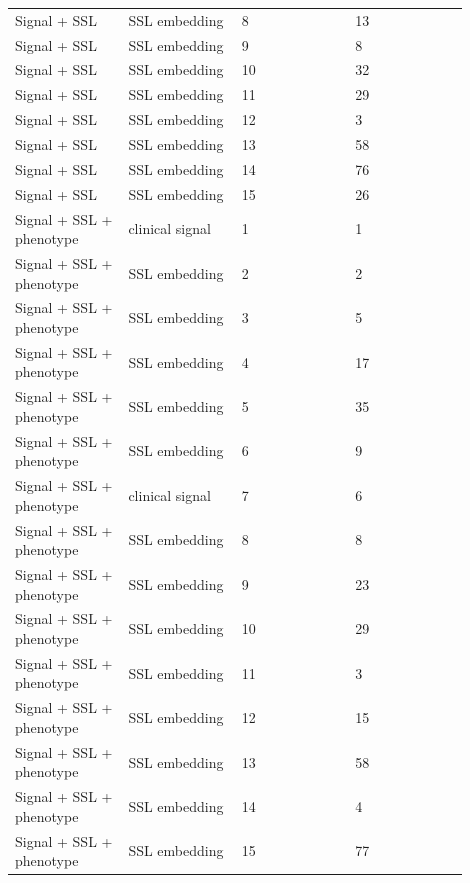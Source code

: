 \documentclass[11pt]{article}
\begin{document}
\begin{landscape}
\begin{longtable}{L{0.225\linewidth} L{0.225\linewidth} L{0.225\linewidth} L{0.225\linewidth}}
Signal + SSL & SSL embedding & 8 & 13 \\
Signal + SSL & SSL embedding & 9 & 8 \\
Signal + SSL & SSL embedding & 10 & 32 \\
Signal + SSL & SSL embedding & 11 & 29 \\
Signal + SSL & SSL embedding & 12 & 3 \\
Signal + SSL & SSL embedding & 13 & 58 \\
Signal + SSL & SSL embedding & 14 & 76 \\
Signal + SSL & SSL embedding & 15 & 26 \\
Signal + SSL + phenotype & clinical signal & 1 & 1 \\
Signal + SSL + phenotype & SSL embedding & 2 & 2 \\
Signal + SSL + phenotype & SSL embedding & 3 & 5 \\
Signal + SSL + phenotype & SSL embedding & 4 & 17 \\
Signal + SSL + phenotype & SSL embedding & 5 & 35 \\
Signal + SSL + phenotype & SSL embedding & 6 & 9 \\
Signal + SSL + phenotype & clinical signal & 7 & 6 \\
Signal + SSL + phenotype & SSL embedding & 8 & 8 \\
Signal + SSL + phenotype & SSL embedding & 9 & 23 \\
Signal + SSL + phenotype & SSL embedding & 10 & 29 \\
Signal + SSL + phenotype & SSL embedding & 11 & 3 \\
Signal + SSL + phenotype & SSL embedding & 12 & 15 \\
Signal + SSL + phenotype & SSL embedding & 13 & 58 \\
Signal + SSL + phenotype & SSL embedding & 14 & 4 \\
Signal + SSL + phenotype & SSL embedding & 15 & 77 \\
\end{longtable}
\normalsize
\end{landscape}
\end{document}
